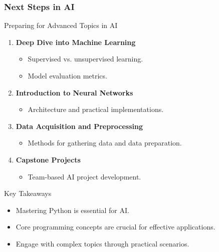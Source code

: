 \documentclass[aspectratio=169]{beamer}
\begin{document}
\begin{frame}[fragile]
    \frametitle{Next Steps in AI}
    \begin{block}{Preparing for Advanced Topics in AI}
        \begin{enumerate}
            \item \textbf{Deep Dive into Machine Learning}
            \begin{itemize}
                \item Supervised vs. unsupervised learning.
                \item Model evaluation metrics.
            \end{itemize}

            \item \textbf{Introduction to Neural Networks}
            \begin{itemize}
                \item Architecture and practical implementations.
            \end{itemize}

            \item \textbf{Data Acquisition and Preprocessing}
            \begin{itemize}
                \item Methods for gathering data and data preparation.
            \end{itemize}

            \item \textbf{Capstone Projects}
            \begin{itemize}
                \item Team-based AI project development.
            \end{itemize}
        \end{enumerate}
    \end{block}

    \begin{block}{Key Takeaways}
        \begin{itemize}
            \item Mastering Python is essential for AI.
            \item Core programming concepts are crucial for effective applications.
            \item Engage with complex topics through practical scenarios.
        \end{itemize}
    \end{block}
\end{frame}
\end{document}
